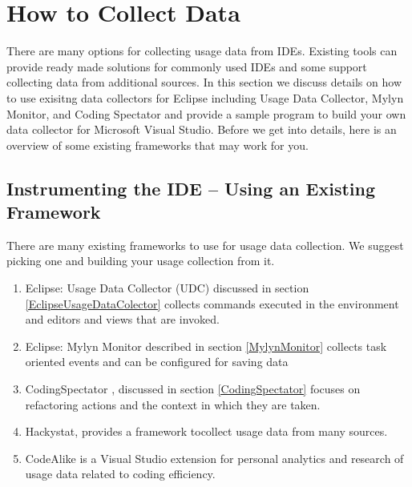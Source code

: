 \section{How to Collect Data}

\label{SecHowToCollectData}

There are many options for collecting usage data from IDEs.   Existing tools can provide ready made solutions for commonly used IDEs and some support collecting data from additional sources.  In this section we discuss details on how to use exisitng data collectors for Eclipse including Usage Data Collector, Mylyn Monitor, and Coding Spectator and provide a sample program to build your own data collector for Microsoft Visual Studio.  Before we get into details, here is an overview of some existing frameworks that may work for you.

\subsection{Instrumenting the IDE -- Using an Existing Framework} %

There are many existing frameworks to use for usage data collection.  We suggest picking one and building your usage collection from it.

\begin{enumerate}

	\item Eclipse: Usage Data Collector (UDC) discussed in section \ref{EclipseUsageDataColector} collects commands executed in the environment and editors and views that are invoked.
	
	\item Eclipse: Mylyn Monitor described in section \ref{MylynMonitor} collects task oriented events and can be configured for saving data
	
	\item CodingSpectator %
, discussed in section \ref{CodingSpectator} focuses on refactoring actions and the context in which they are taken.
	
	\item Hackystat\cite{V:johnson2003beyond}, %
	provides a framework tocollect usage data from many sources.
	
	\item CodeAlike is a Visual Studio extension for personal analytics and research of usage data related to coding efficiency.

\end{enumerate}

